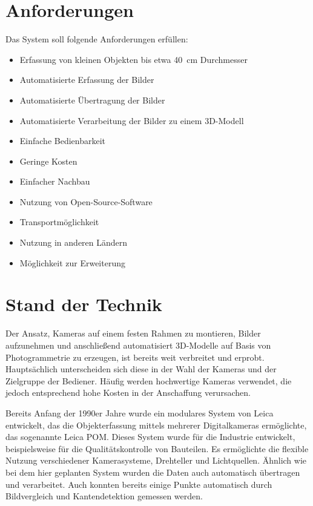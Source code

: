 \documentclass[./00PhotoBox]{subfiles}
\begin{document}
\section{Anforderungen}
\label{sec:anforderungen}
Das System soll folgende Anforderungen erfüllen:

\begin{itemize}
    \item Erfassung von kleinen Objekten bis etwa 40~cm Durchmesser
    \item Automatisierte Erfassung der Bilder
    \item Automatisierte Übertragung der Bilder
    \item Automatisierte Verarbeitung der Bilder zu einem 3D-Modell
    \item Einfache Bedienbarkeit
    \item Geringe Kosten
    \item Einfacher Nachbau
    \item Nutzung von Open-Source-Software
    \item Transportmöglichkeit
    \item Nutzung in anderen Ländern
    \item Möglichkeit zur Erweiterung
\end{itemize}

\section{Stand der Technik}
Der Ansatz, Kameras auf einem festen Rahmen zu montieren, Bilder aufzunehmen und anschließend automatisiert 3D-Modelle auf Basis von Photogrammetrie zu erzeugen, ist bereits weit verbreitet und erprobt. Hauptsächlich unterscheiden sich diese in der Wahl der Kameras und der Zielgruppe der Bediener. Häufig werden hochwertige Kameras verwendet, die jedoch entsprechend hohe Kosten in der Anschaffung verursachen.

Bereits Anfang der 1990er Jahre wurde ein modulares System von Leica entwickelt, das die Objekterfassung mittels mehrerer Digitalkameras ermöglichte, das sogenannte Leica POM.  Dieses System wurde für die Industrie entwickelt, beispielsweise für die Qualitätskontrolle von Bauteilen. Es ermöglichte die flexible Nutzung verschiedener Kamerasysteme, Drehteller und Lichtquellen. Ähnlich wie bei dem hier geplanten System wurden die Daten auch automatisch übertragen und verarbeitet. Auch konnten bereits einige Punkte automatisch durch Bildvergleich und Kantendetektion gemessen werden.
\citep{leica_pom_concept}
\end{document}
